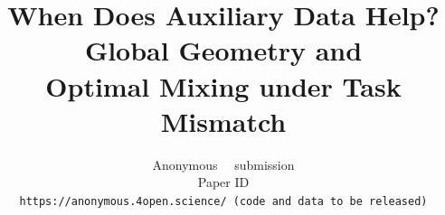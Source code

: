 \documentclass[10pt,twocolumn,letterpaper]{article}
\title{When Does Auxiliary Data Help? Global Geometry and\\
Optimal Mixing under Task Mismatch}
\author{Anonymous \confName~\confYear~submission\\
Paper ID \paperID\\
{\tt\small https://anonymous.4open.science/ (code and data to be released)}
}
\begin{document}
\maketitle








{
    \small
    
    
}

% 
\end{document}
